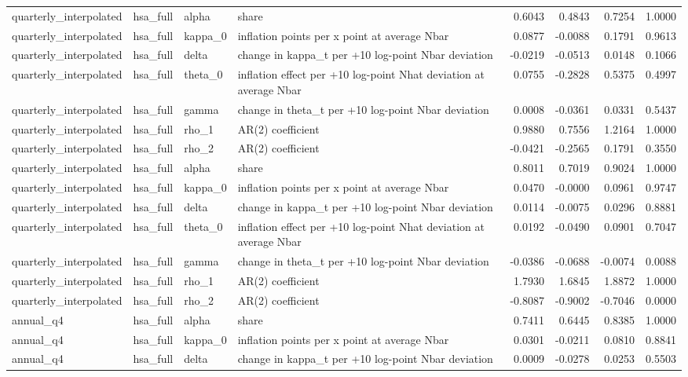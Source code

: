 \begin{tabular}{llllrrrr}
quarterly\_interpolated & hsa\_full & alpha & share & 0.6043 & 0.4843 & 0.7254 & 1.0000 \\
quarterly\_interpolated & hsa\_full & kappa\_0 & inflation points per x point at average Nbar & 0.0877 & -0.0088 & 0.1791 & 0.9613 \\
quarterly\_interpolated & hsa\_full & delta & change in kappa\_t per +10 log-point Nbar deviation & -0.0219 & -0.0513 & 0.0148 & 0.1066 \\
quarterly\_interpolated & hsa\_full & theta\_0 & inflation effect per +10 log-point Nhat deviation at average Nbar & 0.0755 & -0.2828 & 0.5375 & 0.4997 \\
quarterly\_interpolated & hsa\_full & gamma & change in theta\_t per +10 log-point Nbar deviation & 0.0008 & -0.0361 & 0.0331 & 0.5437 \\
quarterly\_interpolated & hsa\_full & rho\_1 & AR(2) coefficient & 0.9880 & 0.7556 & 1.2164 & 1.0000 \\
quarterly\_interpolated & hsa\_full & rho\_2 & AR(2) coefficient & -0.0421 & -0.2565 & 0.1791 & 0.3550 \\
quarterly\_interpolated & hsa\_full & alpha & share & 0.8011 & 0.7019 & 0.9024 & 1.0000 \\
quarterly\_interpolated & hsa\_full & kappa\_0 & inflation points per x point at average Nbar & 0.0470 & -0.0000 & 0.0961 & 0.9747 \\
quarterly\_interpolated & hsa\_full & delta & change in kappa\_t per +10 log-point Nbar deviation & 0.0114 & -0.0075 & 0.0296 & 0.8881 \\
quarterly\_interpolated & hsa\_full & theta\_0 & inflation effect per +10 log-point Nhat deviation at average Nbar & 0.0192 & -0.0490 & 0.0901 & 0.7047 \\
quarterly\_interpolated & hsa\_full & gamma & change in theta\_t per +10 log-point Nbar deviation & -0.0386 & -0.0688 & -0.0074 & 0.0088 \\
quarterly\_interpolated & hsa\_full & rho\_1 & AR(2) coefficient & 1.7930 & 1.6845 & 1.8872 & 1.0000 \\
quarterly\_interpolated & hsa\_full & rho\_2 & AR(2) coefficient & -0.8087 & -0.9002 & -0.7046 & 0.0000 \\
annual\_q4 & hsa\_full & alpha & share & 0.7411 & 0.6445 & 0.8385 & 1.0000 \\
annual\_q4 & hsa\_full & kappa\_0 & inflation points per x point at average Nbar & 0.0301 & -0.0211 & 0.0810 & 0.8841 \\
annual\_q4 & hsa\_full & delta & change in kappa\_t per +10 log-point Nbar deviation & 0.0009 & -0.0278 & 0.0253 & 0.5503 \\

\end{tabular}
